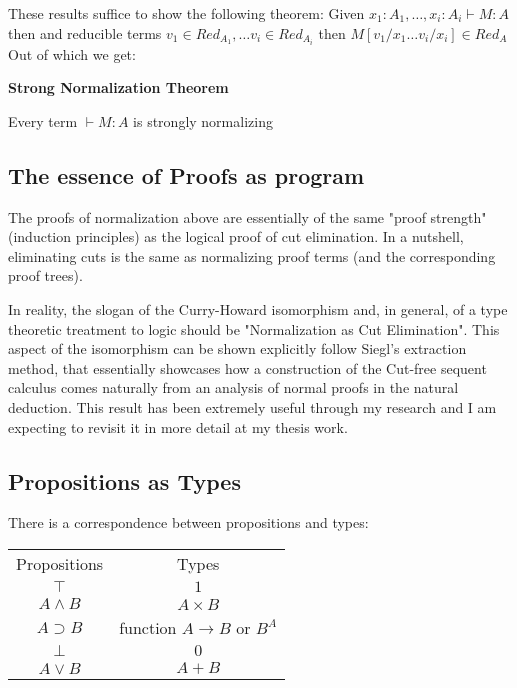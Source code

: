 These results suffice to show the following theorem:
Given $x_1:A_1, \ldots, x_i: A_i\vdash M: A$ then and reducible terms $v_1\in Red_{A_1},\ldots v_i\in Red_{A_i}$ then  $M[v_1/x_1\ldots v_i/x_i]\in Red_A$ 
Out of which we get:
\begin{mdframed}
 	\begin{theorem}
 		\textbf{Strong Normalization Theorem}

 			Every term $\vdash M:A$ is strongly normalizing

 		
 	\end{theorem}
 \end{mdframed}
 
\subsection{The essence of Proofs as program }
The proofs of normalization above are essentially of the same "proof strength" (induction principles) as the logical proof of cut elimination. In a nutshell, eliminating cuts is the same as normalizing proof terms (and the corresponding proof trees).

In reality, the slogan of the Curry-Howard isomorphism and, in general, of a type theoretic treatment to logic should be "Normalization as Cut Elimination". This aspect of the isomorphism can be shown explicitly follow Siegl's extraction method, that essentially showcases how a construction of the Cut-free sequent calculus comes naturally from an analysis of normal proofs in the natural deduction. This result has been extremely useful through my research and I am expecting to revisit it in more detail at my thesis work.

 
\subsection{Propositions as Types}



There is a correspondence between propositions and types:
\begin{center}
  \begin{tabular}{@{} cc @{}}

    Propositions & Types \\

    $\top$ & $1$ \\
    $A\wedge B$ & $A\times B$ \\
    $A\supset B$ & function $A\to B$ or $B^A$ \\
    $\bot$ & $0$ \\
    $A\vee B$ & $A+B$\\

  \end{tabular}
\end{center}



